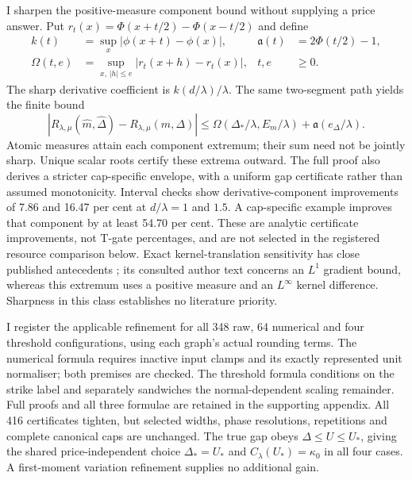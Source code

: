 \documentclass[11pt]{article}
\begin{document}
I sharpen the positive-measure component bound without supplying a price
answer. Put $r_t(x)=\Phi(x+t/2)-\Phi(x-t/2)$ and define
\begin{equation}
\begin{aligned}
k(t)&=\sup_x|\phi(x+t)-\phi(x)|, &
\mathfrak a(t)&=2\Phi(t/2)-1,\\
\Omega(t,e)&=\sup_{x,\,|h|\leq e}|r_t(x+h)-r_t(x)|, &
t,e&\geq0.
\end{aligned}
\label{eq:sharp-component-definition-main}
\end{equation}
The sharp derivative coefficient is $k(d/\lambda)/\lambda$. The same
two-segment path yields the finite bound
\begin{equation}
|R_{\lambda,\mu}(\widehat m,\widehat\Delta)-R_{\lambda,\mu}(m,\Delta)|
\leq\Omega(\Delta_*/\lambda,E_m/\lambda)
                  +\mathfrak a(e_\Delta/\lambda).
\label{eq:sharp-component-path-main}
\end{equation}
Atomic measures attain each component extremum; their sum need not be
jointly sharp. Unique scalar roots certify these extrema outward.
The full proof also derives a stricter cap-specific envelope, with a
uniform gap certificate rather than assumed monotonicity. Interval checks
show derivative-component improvements of 7.86 and 16.47 per cent at
$d/\lambda=1$ and $1.5$. A cap-specific example improves that component
by at least 54.70 per cent. These are analytic certificate improvements,
not T-gate percentages, and are not selected in the registered resource
comparison below. Exact kernel-translation sensitivity has close published
antecedents \citep{duchi2012}; its consulted author text concerns an
$L^1$ gradient bound, whereas this extremum uses a positive measure and
an $L^\infty$ kernel difference. Sharpness in this class establishes no
literature priority.

I register the applicable refinement for all 348 raw, 64 numerical and
four threshold configurations, using each graph's actual rounding terms.
The numerical formula requires inactive input clamps and its exactly
represented unit normaliser; both premises are checked. The threshold
formula conditions on the strike label and separately sandwiches the
normal-dependent scaling remainder. Full proofs and all three formulae
are retained in the supporting appendix. All 416 certificates tighten,
but selected widths, phase resolutions, repetitions and complete canonical
caps are unchanged. The true gap obeys $\Delta\leq U\leq U_*$, giving
the shared price-independent choice $\Delta_*=U_*$ and
$C_\lambda(U_*)=\kappa_0$ in all four cases. A first-moment variation
refinement supplies no additional gain.
\end{document}
